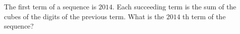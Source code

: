 The first term of a sequence is $2014$. Each succeeding term is the sum of the cubes of the digits of the previous term. What is the $2014$ th term of the sequence?
